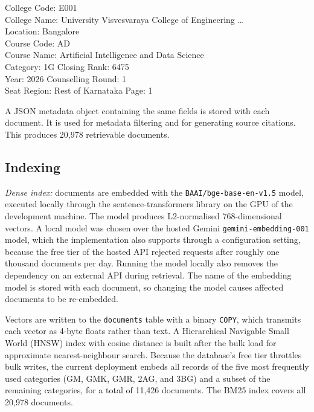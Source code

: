 \documentclass[conference]{IEEEtran}
\begin{document}
\begin{center}
\begin{minipage}{0.92\columnwidth}
\footnotesize\ttfamily
College Code: E001\\
College Name: University Visvesvaraya College of Engineering \ldots\\
Location: Bangalore\\
Course Code: AD\\
Course Name: Artificial Intelligence and Data Science\\
Category: 1G \quad Closing Rank: 6475\\
Year: 2026 \quad Counselling Round: 1\\
Seat Region: Rest of Karnataka \quad Page: 1
\end{minipage}
\end{center}

A JSON metadata object containing the same fields is stored
with each document. It is used for metadata filtering and for
generating source citations. This produces 20,978 retrievable
documents.

\subsection{Indexing}
\label{sec:index}

\textit{Dense index:} documents are embedded with the
\texttt{BAAI/bge-base-en-v1.5} model, executed locally through the
sentence-transformers library on the GPU of the development machine.
The model produces L2-normalised 768-dimensional vectors. A local
model was chosen over the hosted Gemini \texttt{gemini-embedding-001}
model, which the implementation also supports through a configuration
setting, because the free tier of the hosted API rejected requests
after roughly one thousand documents per day. Running the model locally
also removes the dependency on an external API during retrieval. The
name of the embedding model is stored with each document, so changing
the model causes affected documents to be re-embedded.

Vectors are written to the \texttt{documents} table with a binary
\texttt{COPY}, which transmits each vector as 4-byte floats rather
than text. A Hierarchical Navigable Small World (HNSW) index with
cosine distance is built after the bulk load for approximate
nearest-neighbour search. Because the database's free tier throttles
bulk writes, the current deployment embeds all records of the five
most frequently used categories (GM, GMK, GMR, 2AG, and 3BG) and a
subset of the remaining categories, for a total of 11,426 documents.
The BM25 index covers all 20,978 documents.
\end{document}
